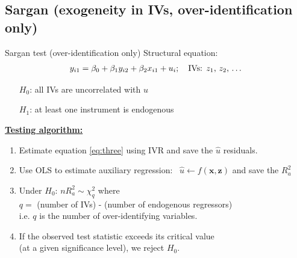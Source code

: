 \documentclass[usenames,dvipsnames]{beamer}
\begin{document}
\subsection{Sargan (exogeneity in IVs, over-identification only)}
\begin{frame}{Sargan test (over-identification only)}
Structural equation: 
\begin{align}
\label{eq:three} y_{i1}=\beta_0+\beta_1 y_{i2} + \beta_2 x_{i1} + u_i; \quad \text{IVs: $z_1$, $z_2$, \dots}
\end{align}
\vspace{-0.2cm}
\begin{itemize}
\item[$H_0$:] all IVs are uncorrelated with $u$
\item[$H_1$:] at least one instrument is endogenous
\end{itemize}
\bigskip
\textbf{\underline{Testing algorithm:}}
\begin{enumerate}
\item Estimate equation \eqref{eq:three} using IVR and save the $\hat{u}$ residuals.
\item Use OLS to estimate auxiliary regression: \ $\hat{u} \leftarrow f(\bm{x, z})$ and save the $R_a^2$
\item Under $H_0$: $nR_a^2 \sim \chi_q^2$ where \\$q =$ (number of IVs) - (number of endogenous regressors) 
 \\i.e. $q$ is the number of over-identifying variables.
\item If the observed test statistic exceeds its critical value \\(at a given significance level), we reject $H_0$.
\end{enumerate}
\end{frame}
\end{document}
